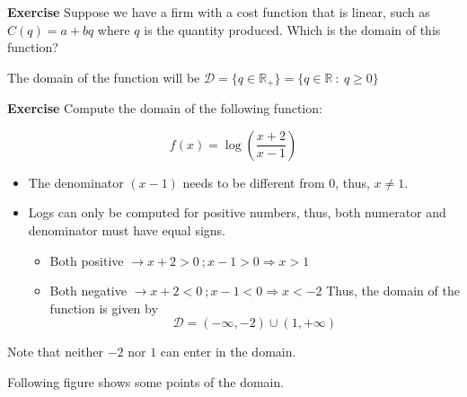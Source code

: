 \documentclass[11pt]{article}
\providecommand{\tightlist}{%
      \setlength{\itemsep}{0pt}\setlength{\parskip}{0pt}}
\begin{document}
\textbf{Exercise} Suppose we have a firm with a cost function that is
linear, such as \(C(q) = a + b q\) where \(q\) is the quantity produced.
Which is the domain of this function?

The domain of the function will be
\(\mathcal{D} = \{q\in\mathbb{R}_+\} = \{q\in\mathbb{R} \ : \ q\geq 0 \}\)

\textbf{Exercise} Compute the domain of the following function:

\[
f(x) = \log\left(\frac{x+2}{x-1}\right)
\]

\begin{itemize}
\tightlist
\item
  The denominator \((x-1)\) needs to be different from \(0\), thus,
  \(x\neq 1\).
\item
  Logs can only be computed for positive numbers, thus, both numerator
  and denominator must have equal signs.

  \begin{itemize}
  \tightlist
  \item
    Both positive \(\rightarrow x+2 > 0 \ ; x-1 > 0 \Rightarrow x > 1\)
  \item
    Both negative \(\rightarrow x+2 < 0 \ ; x-1 < 0 \Rightarrow x < -2\)
    Thus, the domain of the function is given by \[
    \mathcal{D} = (-\infty, -2)\cup(1,+\infty)
    \]
  \end{itemize}
\end{itemize}

Note that neither \(-2\) nor \(1\) can enter in the domain.

Following figure shows some points of the domain.
\end{document}
